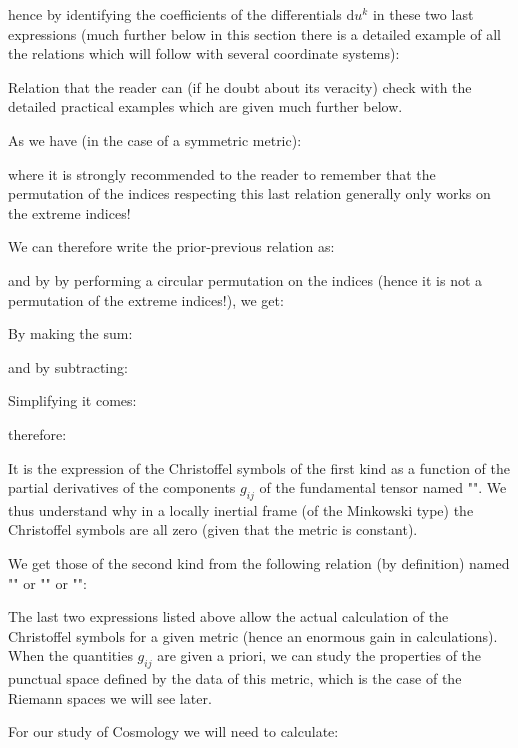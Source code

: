 	hence by identifying the coefficients of the differentials $\mathrm{d}u^k$ in these two last expressions (much further below in this section there is a detailed example of all the relations which will follow with several coordinate systems):
	
	Relation that the reader can (if he doubt about its veracity) check with the detailed practical examples which are given much further below.

	As we have (in the case of a symmetric metric):
	
	where it is strongly recommended to the reader to remember that the permutation of the indices respecting this last relation generally only  works on the extreme indices!

	We can therefore write the prior-previous relation as:
	
	and by by performing a circular permutation on the indices (hence it is not a permutation of the extreme indices!), we get:
	
	By making the sum:
	
	and by subtracting:
	
	Simplifying it comes:
	
	therefore:
	
	It is the expression of the Christoffel symbols of the first kind as a function of the partial derivatives of the components $g_{ij}$ of the fundamental tensor named "\label{first Christoffel identity}". We thus understand why in a locally inertial frame (of the Minkowski type) the Christoffel symbols are all zero (given that the metric is constant).
	
	We get those of the second kind from the following relation (by definition) named "\label{fundamental theorem of Riemannian geometry}" or "" or "":
	
	The last two expressions listed above allow the actual calculation of the Christoffel symbols for a given metric (hence an enormous gain in calculations). When the quantities $g_{ij}$ are given a priori, we can study the properties of the punctual space defined by the data of this metric, which is the case of the Riemann spaces we will see later.
	
	For our study of Cosmology we will need to calculate:
	
